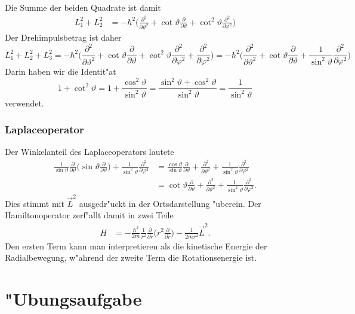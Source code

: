 Die Summe der beiden Quadrate ist damit
\begin{align*}
L_1^2+L_2^2
&=
-\hbar^2\biggl(
\frac{\partial^2}{\partial\vartheta^2}
+
\cot\vartheta\frac{\partial}{\partial\vartheta}
+
\cot^2\vartheta\frac{\partial^2}{\partial\varphi^2}
\biggr)
\end{align*}
Der Drehimpulsbetrag ist daher
\[
L_1^2+L_2^2+L_3^2
=
-\hbar^2\biggl(
\frac{\partial^2}{\partial\vartheta^2}
+
\cot\vartheta\frac{\partial}{\partial\vartheta}
+
\cot^2\vartheta\frac{\partial^2}{\partial\varphi^2}
+
\frac{\partial^2}{\partial\varphi^2}
\biggr)
=
-\hbar^2\biggl(
\frac{\partial^2}{\partial\vartheta^2}
+
\cot\vartheta\frac{\partial}{\partial\vartheta}
+
\frac1{\sin^2\vartheta}\frac{\partial^2}{\partial\varphi^2}
\biggr)
\]
Darin haben wir die Identit"at
\[
1+\cot^2\vartheta
=
1+\frac{\cos^2\vartheta}{\sin^2\vartheta}
=
\frac{\sin^2\vartheta+\cos^2\vartheta}{\sin^2\vartheta}
=
\frac{1}{\sin^2\vartheta}
\]
verwendet.

\subsubsection{Laplaceoperator}
Der Winkelanteil des Laplaceoperators lautete
\begin{align*}
\frac1{\sin\vartheta}\frac{\partial}{\partial\vartheta}\biggl(
\sin\vartheta\frac{\partial}{\partial\vartheta}
\biggr)
+\frac1{\sin^2\vartheta}\frac{\partial^2}{\partial\varphi^2}
&=
\frac{\cos\vartheta}{\sin\vartheta}\frac{\partial}{\partial\vartheta}
+
\frac{\partial^2}{\partial\vartheta^2}
+
\frac{1}{\sin^2\vartheta}\frac{\partial^2}{\partial\varphi^2}
\\
&=
\cot\vartheta\frac{\partial}{\partial\vartheta}
+
\frac{\partial^2}{\partial\vartheta^2}
+
\frac{1}{\sin^2\vartheta}\frac{\partial^2}{\partial\varphi^2}.
\end{align*}
Dies stimmt mit $\vec L^2$ ausgedr"uckt in der Ortsdarstellung "uberein.
Der Hamiltonoperator zerf"allt damit in zwei Teile
\begin{align*}
H
&=-\frac{\hbar^2}{2m}
\frac1{r^2}\frac{\partial}{\partial r}\biggl(r^2\frac{\partial}{\partial r}\biggr)
-\frac{1}{2mr^2}\vec L^2.
\end{align*}
Den ersten Term kann man interpretieren als die kinetische Energie
der Radialbewegung, w"ahrend der zweite Term die Rotationsenergie ist.

\section*{"Ubungsaufgabe}
\begin{uebungsaufgaben}
\item

\end{uebungsaufgaben}
